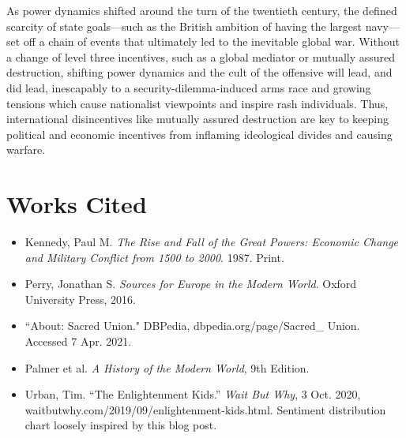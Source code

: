 \documentclass[letterpaper]{article}
\begin{document}
As power dynamics shifted around the turn of the twentieth century, the defined scarcity of state goals---such as the British ambition of having the largest navy---set off a chain of events that ultimately led to the inevitable global war. Without a change of level three incentives, such as a global mediator or mutually assured destruction, shifting power dynamics and the cult of the offensive will lead, and did lead, inescapably to a security-dilemma-induced arms race and growing tensions which cause nationalist viewpoints and inspire rash individuals. Thus, international disincentives like mutually assured destruction are key to keeping political and economic incentives from inflaming ideological divides and causing warfare.

\section{Works Cited}
\label{sec:org5cff4f8}

\begin{itemize}
\item Kennedy, Paul M. \emph{The Rise and Fall of the Great Powers: Economic Change and Military Conflict from 1500 to 2000}. 1987. Print.
\item Perry, Jonathan S. \emph{Sources for Europe in the Modern World}. Oxford University Press, 2016.
\item ``About: Sacred Union." DBPedia, dbpedia.org/page/Sacred\_ Union. Accessed 7 Apr. 2021.
\item Palmer et al. \emph{A History of the Modern World}, 9th Edition.
\item Urban, Tim. “The Enlightenment Kids.” \emph{Wait But Why}, 3 Oct. 2020, waitbutwhy.com/2019/09/enlightenment-kids.html. Sentiment distribution chart loosely inspired by this blog post.
\end{itemize}
\end{document}
